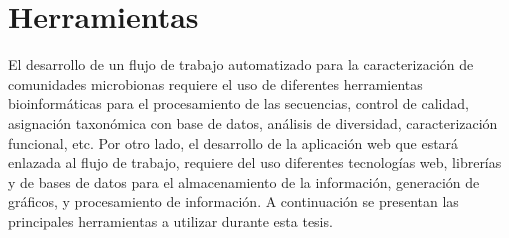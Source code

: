 










\section{Herramientas}
El desarrollo de un flujo de trabajo automatizado para la caracterización de comunidades microbionas requiere el uso de diferentes herramientas bioinformáticas para el procesamiento de las secuencias, control de calidad, asignación taxonómica con base de datos, análisis de diversidad, caracterización funcional, etc. Por otro lado, el desarrollo de la aplicación web que estará enlazada al flujo de trabajo, requiere del uso diferentes tecnologías web, librerías y de bases de datos para el almacenamiento de la información, generación de gráficos, y procesamiento de información. A continuación se presentan las principales herramientas a utilizar durante esta tesis.
